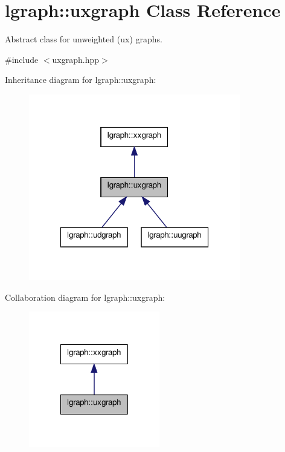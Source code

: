 \hypertarget{classlgraph_1_1uxgraph}{\section{lgraph\-:\-:uxgraph Class Reference}
\label{classlgraph_1_1uxgraph}
}


Abstract class for unweighted (ux) graphs.  




{\ttfamily \#include $<$uxgraph.\-hpp$>$}



Inheritance diagram for lgraph\-:\-:uxgraph\-:
\nopagebreak
\begin{figure}[H]
\begin{center}
\leavevmode
\includegraphics[width=262pt]{classlgraph_1_1uxgraph__inherit__graph}
\end{center}
\end{figure}


Collaboration diagram for lgraph\-:\-:uxgraph\-:
\nopagebreak
\begin{figure}[H]
\begin{center}
\leavevmode
\includegraphics[width=162pt]{classlgraph_1_1uxgraph__coll__graph}
\end{center}
\end{figure}
